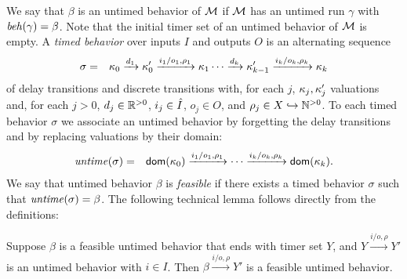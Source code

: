 We say that $\beta$ is an untimed behavior of ${\mathcal M}$ if ${\mathcal M}$ has an untimed run $\gamma$ with $\mathit{beh}(\gamma) = \beta$.
Note that the initial timer set of an untimed behavior of ${\mathcal M}$ is empty.
%
A \emph{timed behavior} over inputs $I$ and outputs $O$ is an alternating sequence
\begin{eqnarray}
\label{timedbehavior}
\sigma & = & \kappa_0 \xrightarrow{d_1} \kappa'_0 \xrightarrow{i_1/o_1, \rho_1} \kappa_1 \cdots
\xrightarrow{d_k} \kappa'_{k-1} \xrightarrow{i_k/o_k, \rho_k} \kappa_{k}
\end{eqnarray}
of delay transitions and discrete transitions with, for each $j$,
$\kappa_j, \kappa'_j$ valuations and,
for each $j>0$,  $d_j \in {\mathbb R}^{> 0}$, $i_j \in \hat{I}$, $o_j \in O$, and $\rho_j \in X \hookrightarrow {\mathbb N}^{>0}$.
To each timed behavior $\sigma$ we associate an untimed behavior by forgetting the
delay transitions and by replacing valuations by their domain:
\begin{eqnarray*}
\mathit{untime}(\sigma) & = & {\textsf{dom}}(\kappa_0) \xrightarrow{i_1/o_1, \rho_1}  \cdots \xrightarrow{i_k/o_k, \rho_k} {\textsf{dom}}(\kappa_k).
\end{eqnarray*}
We say that untimed behavior $\beta$ is \emph{feasible} if there exists a timed behavior $\sigma$ such that $\mathit{untime}(\sigma) = \beta$.
The following technical lemma follows directly from the definitions:

\begin{lemma}
\label{feasible plus input is feasible}
Suppose $\beta$ is a feasible untimed behavior that ends with timer set $Y$, and 
$Y \xrightarrow{i/o, \rho} Y'$ is an untimed behavior with $i \in I$.
Then $\beta \xrightarrow{i/o, \rho} Y'$ is a feasible untimed behavior.
\end{lemma}

